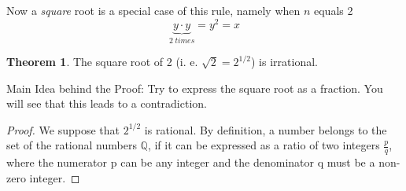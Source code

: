 \documentclass[11pt]{amsart}
\theoremstyle{definition}
\newtheorem{theorem}{Theorem}
\begin{document}
Now a \emph{square} root is a special case of this rule, namely when \(n\) equals 2
\begin{equation}
    \underbrace{y \cdot y}_{2 \; times} = y^{2} = x
\end{equation}

\begin{theorem}
    The square root of 2 (i. e. \( \sqrt{2} = 2^{1/2}\)) is irrational.
\end{theorem}
Main Idea behind the Proof: Try to express the square root as a fraction. You will see that this leads to a contradiction.
\begin{proof}
    We suppose that \(2^{1/2}\) is rational. By definition, a number belongs to the set of the rational numbers \(\mathbb{Q}\), if it can be expressed as a ratio of two integers  \(\frac{p}{q}\), where the numerator p can be any integer and the denominator q must be a non-zero integer.


\end{proof}
\end{document}
